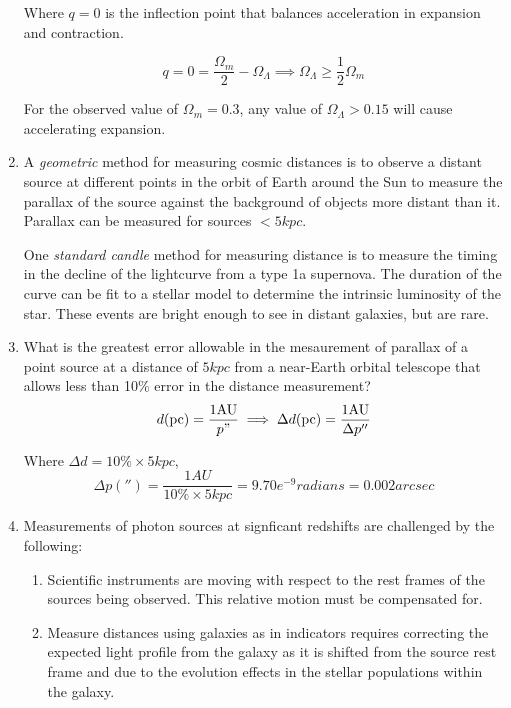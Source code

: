 \documentclass{paper}
\begin{document}
\begin{enumerate}
      Where \(q=0\) is the inflection point that balances acceleration
      in expansion and contraction.

      \[
        q = 0 = \frac{\Omega_m}{2}-\Omega_\Lambda \implies
        \Omega_\Lambda \geq \frac{1}{2}\Omega_m 
      \]

      For the observed value of \(\Omega_m = 0.3\), any value of 
      \(\Omega_\Lambda > 0.15\) will cause accelerating expansion.

    \item %
      A \textit{geometric} method for measuring cosmic distances is to 
      observe a distant source at different points in the orbit of Earth
      around the Sun to measure the parallax of the source against the
      background of objects more distant than it. Parallax can be measured
      for sources \(< 5 \si{kpc}\).

      One \textit{standard candle} method for measuring distance is to 
      measure the timing in the decline of the lightcurve from a type 1a
      supernova. The duration of the curve can be fit to a stellar model
      to determine the intrinsic luminosity of the star. These events are
      bright enough to see in distant galaxies, but are rare.
      
    \item %
      What is the greatest error allowable in the mesaurement of parallax
      of a point source at a distance of \(5 \si{kpc}\) from a near-Earth
      orbital telescope that allows less than 10\% error in the distance
      measurement?
      \[
        d(\si{pc}) = \frac{1 \si{AU}}{p"} \implies
        \Delta d(\si{pc}) = \frac{1 \si{AU}}{\Delta p\si{''}}
      \]

      Where \(\Delta d = 10\% \times 5 \si{kpc}\),
      \[ 
        \Delta p(\si{''}) = \frac{1 \si{AU}}{10\% \times 5 \si{kpc}} 
        = 9.70e^{-9} \si{radians} = 0.002 \si{arcsec}
      \]

    \item %
      Measurements of photon sources at signficant redshifts are challenged
      by the following:

      \begin{enumerate}

        \item
          Scientific instruments are moving with respect to the rest frames
          of the sources being observed. This relative motion must be
          compensated for.

        \item
          Measure distances using galaxies as in indicators requires 
          correcting the expected light profile from the galaxy as it is 
          shifted from the source rest frame and due to the evolution
          effects in the stellar populations within the galaxy.


\end{enumerate}
\end{enumerate}
\end{document}
